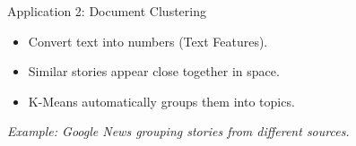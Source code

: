 \begin{frame}{Application 2: Document Clustering}
\begin{tikzpicture}[scale=0.65, transform shape]
\end{tikzpicture}

\begin{tcolorbox}[colback=yellow!5, colframe=orange!40, title=\textbf{Process}]
\begin{itemize}
    \item Convert text into numbers (Text Features).
    \item Similar stories appear close together in space.
    \item K-Means automatically groups them into topics.
\end{itemize}
\end{tcolorbox}

\centering
\small \textit{Example: Google News grouping stories from different sources.}

\end{frame}


